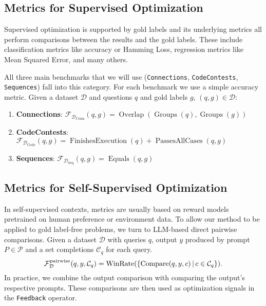 \subsection{Metrics for Supervised Optimization}
Supervised optimization is supported by gold labels and its underlying metrics all perform comparisons between the results and the gold labels.
These include classification metrics like accuracy or Hamming Loss, regression metrics like Mean Squared Error, and many others.

All three main benchmarks that we will use (\texttt{Connections}, \texttt{CodeContests}, \texttt{Sequences}) 
fall into this category. For each benchmark we use a simple accuracy metric. Given a dataset $\mathcal{D}$ and questions $q$ and gold labels $g$, $(q,g) \in \mathcal{D}$:
\begin{enumerate}
    \item \textbf{Connections}:  $\mathcal{F}_{\mathcal{D}_{\text{Conn}}}(q, g) = \operatorname{Overlap}(\operatorname{Groups}(q), \operatorname{Groups}(g))$
    \item \textbf{CodeContests}: $\mathcal{F}_{\mathcal{D}_{\text{Code}}}(q, g) = \operatorname{FinishesExecution}(q) + \operatorname{PassesAllCases}(q, g)$
    \item \textbf{Sequences}: $\mathcal{F}_{\mathcal{D}_{\text{Seq}}}(q, g) = \operatorname{Equals}(q, g)$
\end{enumerate} 

\subsection{Metrics for Self-Supervised Optimization}\label{sec:ssometrics}
In self-supervised contexts, metrics are usually based on reward models pretrained on human preference or environment data.
To allow our method to be applied to gold label-free problems, we turn to LLM-based direct pairwise comparisons.
Given a dataset $\mathcal{D}$ with queries $q$, output $y$ produced by prompt $P \in \mathcal{P}$ and a set completions $\mathcal{C}_{q}$ for each query.
\begin{equation}
    \mathcal{F}_{\mathcal{D}}^{\text{pairwise}}(q, y, \mathcal{C}_{q}) = \operatorname{WinRate}(\{\operatorname{Compare}(q,y,c)\, \vert \, c\in \mathcal{C}_{q}\}).
\end{equation}
In practice, we combine the output comparison with comparing the output's respective prompts.
These comparisons are then used as optimization signals in the \texttt{Feedback} operator.

